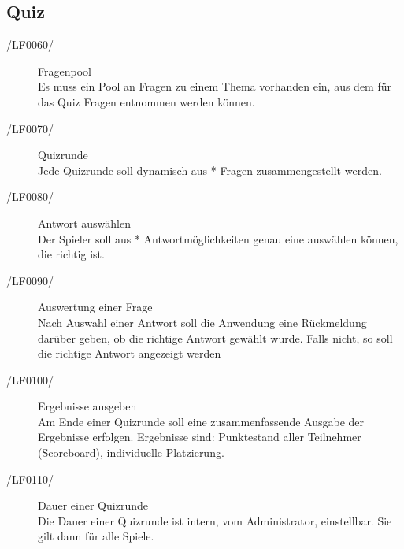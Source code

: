 \documentclass[11pt,a4paper]{scrreprt}
\begin{document}
\subsection{Quiz}
\begin{description}
\item[/LF0060/] Fragenpool \\
Es muss ein Pool an Fragen zu einem Thema vorhanden ein, aus dem für das Quiz Fragen entnommen werden können.
\item[/LF0070/] Quizrunde \\
Jede Quizrunde soll dynamisch aus * Fragen zusammengestellt werden.
\item[/LF0080/] Antwort auswählen \\
Der Spieler soll aus * Antwortmöglichkeiten genau eine auswählen können, die richtig ist.
\item[/LF0090/]Auswertung einer Frage \\ 
Nach Auswahl einer Antwort soll die Anwendung eine Rückmeldung darüber geben, ob die richtige Antwort gewählt wurde. Falls nicht, so soll die richtige Antwort angezeigt werden %
\item[/LF0100/] Ergebnisse ausgeben \\
Am Ende einer Quizrunde soll eine zusammenfassende Ausgabe der Ergebnisse erfolgen. Ergebnisse sind: Punktestand aller Teilnehmer (Scoreboard),  individuelle Platzierung.
\item[/LF0110/] Dauer einer Quizrunde \\
 Die Dauer einer Quizrunde ist intern, vom Administrator, einstellbar. Sie gilt dann für alle Spiele.
\end{description}
\end{document}
